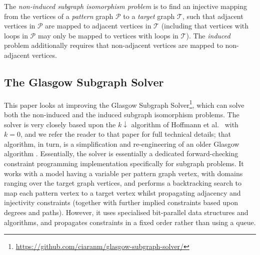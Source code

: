 \documentclass[runningheads]{llncs}
\newcommand{\citet}[2]{#1\cite{#2}}
\begin{document}
The \emph{non-induced subgraph isomorphism problem} is to find an injective mapping from the
vertices of a \emph{pattern} graph $\mathcal{P}$ to a \emph{target} graph $\mathcal{T}$, such that
adjacent vertices in $\mathcal{P}$ are mapped to adjacent vertices in $\mathcal{T}$ (including that
vertices with loops in $\mathcal{P}$ may only be mapped to vertices with loops in $\mathcal{T}$).
The \emph{induced} problem additionally requires that non-adjacent vertices are mapped to
non-adjacent vertices.


\subsection{The Glasgow Subgraph Solver}

This paper looks at improving the Glasgow Subgraph
Solver\footnote{\url{https://github.com/ciaranm/glasgow-subgraph-solver/}}, which can solve both the
non-induced and the induced subgraph isomorphism problems.  The solver is very closely based upon
the $k{\downarrow}$ algorithm of \citet{Hoffmann et al.\ }{DBLP:conf/aaai/HoffmannMR17} with $k =
0$, and we refer the reader to that paper for full technical details; that algorithm, in turn, is a
simplification and re-engineering of an older Glasgow algorithm
\cite{DBLP:conf/cp/McCreeshP15,DBLP:conf/lion/KotthoffMS16}.  Essentially, the solver is essentially
a dedicated forward-checking constraint programming implementation specifically for subgraph
problems. It works with a model having a variable per pattern graph vertex, with domains ranging
over the target graph vertices, and performs a backtracking search to map each pattern vertex to a
target vertex whilst propagating adjacency and injectivity constraints (together with further
implied constraints based upon degrees and paths).  However, it uses specialised bit-parallel data
structures and algorithms, and propagates constraints in a fixed order rather than using a queue.
\end{document}
